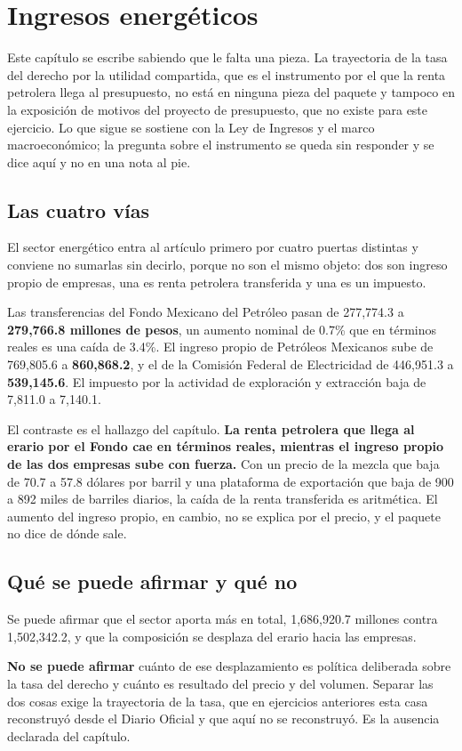 \chapter{Ingresos energéticos}

Este capítulo se escribe sabiendo que le falta una pieza. La trayectoria de la
tasa del derecho por la utilidad compartida, que es el instrumento por el que la
renta petrolera llega al presupuesto, no está en ninguna pieza del paquete y
tampoco en la exposición de motivos del proyecto de presupuesto, que no existe
para este ejercicio. Lo que sigue se sostiene con la Ley de Ingresos y el marco
macroeconómico; la pregunta sobre el instrumento se queda sin responder y se dice
aquí y no en una nota al pie.

\section{Las cuatro vías}

El sector energético entra al artículo primero por cuatro puertas distintas y
conviene no sumarlas sin decirlo, porque no son el mismo objeto: dos son ingreso
propio de empresas, una es renta petrolera transferida y una es un impuesto.



Las transferencias del Fondo Mexicano del Petróleo pasan de 277,774.3 a
\textbf{279,766.8 millones de pesos}, un aumento nominal de 0.7\% que en términos
reales es una caída de 3.4\%. El ingreso propio de Petróleos Mexicanos sube de
769,805.6 a \textbf{860,868.2}, y el de la Comisión Federal de Electricidad de
446,951.3 a \textbf{539,145.6}. El impuesto por la actividad de exploración y
extracción baja de 7,811.0 a 7,140.1.

El contraste es el hallazgo del capítulo. \textbf{La renta petrolera que llega al
erario por el Fondo cae en términos reales, mientras el ingreso propio de las dos
empresas sube con fuerza.} Con un precio de la mezcla que baja de 70.7 a 57.8
dólares por barril y una plataforma de exportación que baja de 900 a 892 miles de
barriles diarios, la caída de la renta transferida es aritmética. El aumento del
ingreso propio, en cambio, no se explica por el precio, y el paquete no dice de
dónde sale.

\section{Qué se puede afirmar y qué no}

Se puede afirmar que el sector aporta más en total, 1,686,920.7 millones contra
1,502,342.2, y que la composición se desplaza del erario hacia las empresas.

\textbf{No se puede afirmar} cuánto de ese desplazamiento es política deliberada
sobre la tasa del derecho y cuánto es resultado del precio y del volumen. Separar
las dos cosas exige la trayectoria de la tasa, que en ejercicios anteriores esta
casa reconstruyó desde el Diario Oficial y que aquí no se reconstruyó. Es la
ausencia declarada del capítulo.

\clearpage
